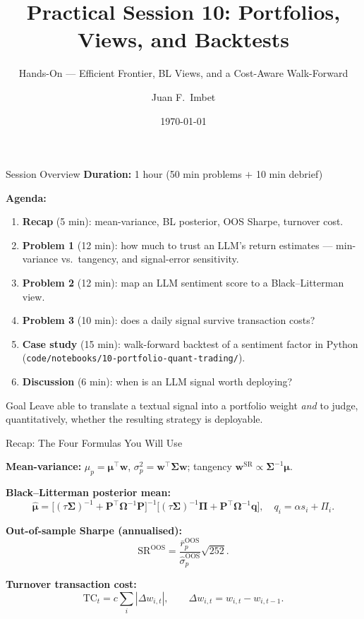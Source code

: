 \documentclass[9pt,t]{beamer}
\title{Practical Session 10: Portfolios, Views, and Backtests}
\subtitle{Hands-On --- Efficient Frontier, BL Views, and a Cost-Aware Walk-Forward}
\author{Juan F.\ Imbet}
\institute{Paris Dauphine -- PSL University}
\date{\today}
\begin{document}
\begin{frame}\titlepage\end{frame}

\begin{frame}{Session Overview}
\textbf{Duration:} 1 hour (50 min problems $+$ 10 min debrief)

\medskip
\textbf{Agenda:}
\begin{enumerate}
  \item \textbf{Recap} (5 min): mean-variance, BL posterior, OOS Sharpe, turnover cost.
  \item \textbf{Problem 1} (12 min): how much to trust an LLM's return estimates --- min-variance vs.\ tangency, and signal-error sensitivity.
  \item \textbf{Problem 2} (12 min): map an LLM sentiment score to a Black--Litterman view.
  \item \textbf{Problem 3} (10 min): does a daily signal survive transaction costs?
  \item \textbf{Case study} (15 min): walk-forward backtest of a sentiment factor in Python
        (\texttt{code/notebooks/10-portfolio-quant-trading/}).
  \item \textbf{Discussion} (6 min): when is an LLM signal worth deploying?
\end{enumerate}

\medskip
\begin{block}{Goal}
Leave able to translate a textual signal into a portfolio weight \emph{and} to judge,
quantitatively, whether the resulting strategy is deployable.
\end{block}
\end{frame}

\begin{frame}{Recap: The Four Formulas You Will Use}
\begin{underhood}
\textbf{Mean-variance:} $\mu_p=\boldsymbol{\mu}^\top\mathbf{w}$,\;
$\sigma_p^2=\mathbf{w}^\top\boldsymbol{\Sigma}\mathbf{w}$;\quad
tangency $\mathbf{w}^{\text{SR}}\propto\boldsymbol{\Sigma}^{-1}\boldsymbol{\mu}$.
\end{underhood}

\medskip
\textbf{Black--Litterman posterior mean:}
\[
\hat{\boldsymbol{\mu}}=
\bigl[(\tau\boldsymbol{\Sigma})^{-1}+\mathbf{P}^\top\boldsymbol{\Omega}^{-1}\mathbf{P}\bigr]^{-1}
\bigl[(\tau\boldsymbol{\Sigma})^{-1}\boldsymbol{\Pi}+\mathbf{P}^\top\boldsymbol{\Omega}^{-1}\mathbf{q}\bigr],
\quad q_i=\alpha s_i+\Pi_i.
\]

\textbf{Out-of-sample Sharpe (annualised):}
\[
\text{SR}^{\text{OOS}}=\frac{\bar r_p^{\text{OOS}}}{\hat\sigma_p^{\text{OOS}}}\sqrt{252}.
\]

\textbf{Turnover transaction cost:}
\[
\text{TC}_t=c\sum_i|\Delta w_{i,t}|,\qquad \Delta w_{i,t}=w_{i,t}-w_{i,t-1}.
\]
\end{frame}
\end{document}
